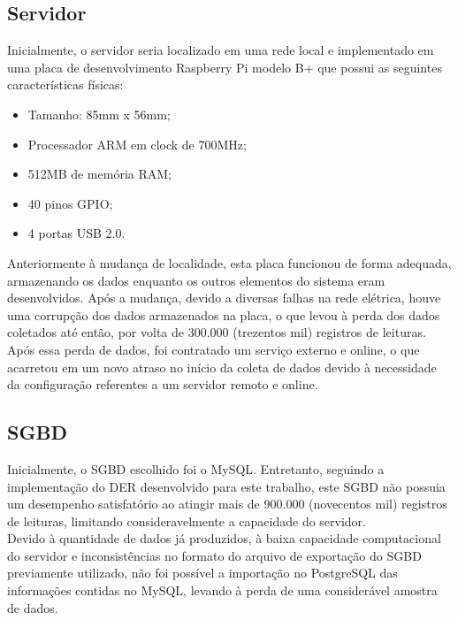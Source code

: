 \subsection{Servidor}
\quad Inicialmente, o servidor seria localizado em uma rede local e implementado em uma placa de desenvolvimento Raspberry Pi modelo B+ que possui as seguintes características físicas:
\begin{itemize}
  \item Tamanho: 85mm x 56mm;
  \item Processador ARM em clock de 700MHz;
  \item 512MB de memória RAM;
  \item 40 pinos GPIO;
  \item 4 portas USB 2.0.
\end{itemize}
\null\quad Anteriormente à mudança de localidade, esta placa funcionou de forma adequada, armazenando os dados enquanto os outros elementos do sistema eram desenvolvidos. Após a mudança, devido a diversas falhas na rede elétrica, houve uma corrupção dos dados armazenados na placa, o que levou à perda dos dados coletados até então, por volta de 300.000 (trezentos mil) registros de leituras. Após essa perda de dados, foi contratado um serviço externo e online, o que acarretou em um novo atraso no início da coleta de dados devido à necessidade da configuração referentes a um servidor remoto e online.

\subsection{\acrlong{SGBD}}
\quad Inicialmente, o \acrshort{SGBD} escolhido foi o MySQL. Entretanto, seguindo a implementação do \acrshort{DER} desenvolvido para este trabalho, este \acrlong{SGBD} não possuia um desempenho satisfatório ao atingir mais de 900.000 (novecentos mil) registros de leituras, limitando consideravelmente a capacidade do servidor.
\\\null \quad Devido à quantidade de dados já produzidos, à baixa capacidade computacional do servidor e  inconsistências no formato do arquivo de exportação do \acrshort{SGBD} previamente utilizado, não foi possível a importação no PostgreSQL das informações contidas no MySQL, levando à perda de uma considerável amostra de dados.
